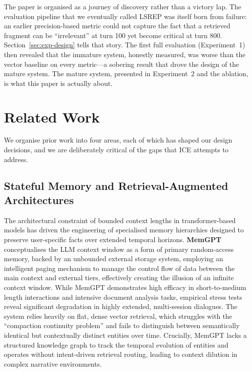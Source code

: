 \documentclass[10pt]{article}
\begin{document}
The paper is organised as a journey of discovery rather than a victory lap. The evaluation pipeline that we eventually called LSREP was itself born from failure: an earlier precision-based metric could not capture the fact that a retrieved fragment can be ``irrelevant'' at turn 100 yet become critical at turn 800. Section~\ref{sec:exp-design} tells that story. The first full evaluation (Experiment~1) then revealed that the immature system, honestly measured, was worse than the vector baseline on every metric---a sobering result that drove the design of the mature system. The mature system, presented in Experiment~2 and the ablation, is what this paper is actually about.

\section{Related Work}
\label{sec:related-work}

We organise prior work into four areas, each of which has shaped our design decisions, and we are deliberately critical of the gaps that ICE attempts to address.

\subsection{Stateful Memory and Retrieval-Augmented Architectures}

The architectural constraint of bounded context lengths in transformer-based models has driven the engineering of specialised memory hierarchies designed to preserve user-specific facts over extended temporal horizons. \textbf{MemGPT} \citep{packer2023memgpt} conceptualises the LLM context window as a form of primary random-access memory, backed by an unbounded external storage system, employing an intelligent paging mechanism to manage the control flow of data between the main context and external tiers, effectively creating the illusion of an infinite context window. While MemGPT demonstrates high efficacy in short-to-medium length interactions and intensive document analysis tasks, empirical stress tests reveal significant degradation in highly extended, multi-session dialogues. The system relies heavily on flat, dense vector retrieval, which struggles with the ``compaction continuity problem'' and fails to distinguish between semantically identical but contextually distinct entities over time. Crucially, MemGPT lacks a structured knowledge graph to track the temporal evolution of entities and operates without intent-driven retrieval routing, leading to context dilution in complex narrative environments.
\end{document}
